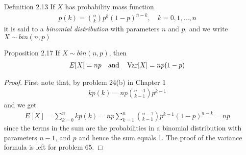 \begin{boks}{Definition 2.13}
  If $X$ has probability mass function
  \begin{align*}
    p(k) = \binom{n}{k} p^k (1 - p)^{n - k}, \quad k = 0, 1, \ldots, n
  \end{align*}
  it is said to a \textit{binomial distribution} with parameters $n$ and $p$, and we write $X \sim bin(n,p)$
\end{boks}

\begin{boks}{Proposition 2.17}
  If $X \sim bin(n, p)$, then
  \begin{align*}
    E[X] = np \quad \text{and} \quad \operatorname{Var}[X] = np(1 - p)
  \end{align*}
\end{boks}
\begin{proof}
  First note that, by problem 24(b) in Chapter 1
  \begin{align*}
    kp(k) = np \binom{n - 1}{k - 1} p^{k - 1}
  \end{align*}
  and we get
  \begin{align*}
    E[X] = \sum_{k = 0}^n kp(k) = np \sum_{k = 1}^n \binom{n - 1}{k - 1}p^{k - 1}(1 - p)^{n - k} = np
  \end{align*}
  since the terms in the sum are the probabilities in a binomial distribution with parameters $n - 1$, and $p$ and hence the sum equals 1.
  The proof of the variance formula is left for problem 65.
\end{proof}
